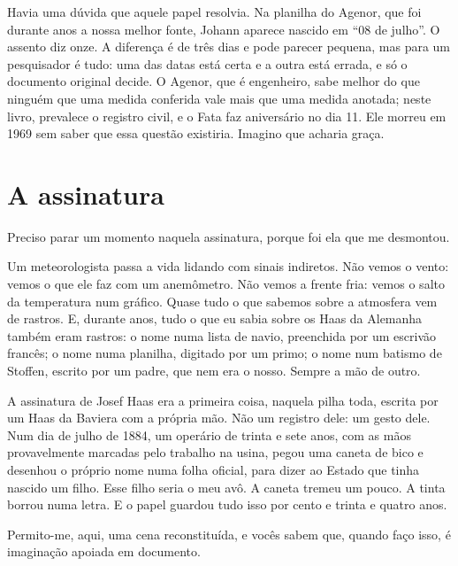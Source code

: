 \documentclass[
  brazilian,
  11pt,
  openany]{book}
\begin{document}
Havia uma dúvida que aquele papel resolvia. Na planilha do Agenor, que
foi durante anos a nossa melhor fonte, Johann aparece nascido em ``08 de
julho''. O assento diz onze. A diferença é de três dias e pode parecer
pequena, mas para um pesquisador é tudo: uma das datas está certa e a
outra está errada, e só o documento original decide. O Agenor, que é
engenheiro, sabe melhor do que ninguém que uma medida conferida vale
mais que uma medida anotada; neste livro, prevalece o registro civil, e
o Fata faz aniversário no dia 11. Ele morreu em 1969 sem saber que essa
questão existiria. Imagino que acharia graça.

\section{A assinatura}\label{a-assinatura}

Preciso parar um momento naquela assinatura, porque foi ela que me
desmontou.

Um meteorologista passa a vida lidando com sinais indiretos. Não vemos o
vento: vemos o que ele faz com um anemômetro. Não vemos a frente fria:
vemos o salto da temperatura num gráfico. Quase tudo o que sabemos sobre
a atmosfera vem de rastros. E, durante anos, tudo o que eu sabia sobre
os Haas da Alemanha também eram rastros: o nome numa lista de navio,
preenchida por um escrivão francês; o nome numa planilha, digitado por
um primo; o nome num batismo de Stoffen, escrito por um padre, que nem
era o nosso. Sempre a mão de outro.

A assinatura de Josef Haas era a primeira coisa, naquela pilha toda,
escrita por um Haas da Baviera com a própria mão. Não um registro dele:
um gesto dele. Num dia de julho de 1884, um operário de trinta e sete
anos, com as mãos provavelmente marcadas pelo trabalho na usina, pegou
uma caneta de bico e desenhou o próprio nome numa folha oficial, para
dizer ao Estado que tinha nascido um filho. Esse filho seria o meu avô.
A caneta tremeu um pouco. A tinta borrou numa letra. E o papel guardou
tudo isso por cento e trinta e quatro anos.

Permito-me, aqui, uma cena reconstituída, e vocês sabem que, quando faço
isso, é imaginação apoiada em documento.
\end{document}

